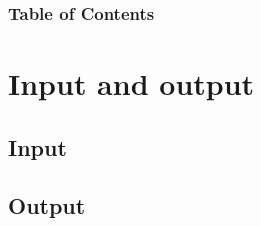 \documentclass{beamer}
\subtitle{Session 4: Input/Output}
\begin{document}
\frame{\titlepage}

\begin{frame}
\frametitle{Table of Contents}
\tableofcontents
\end{frame}


\section{Input and output}

\subsection{Input}


\subsection{Output}
\end{document}
